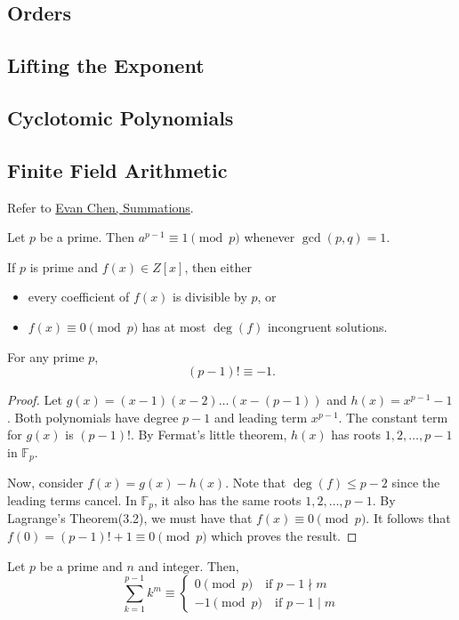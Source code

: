 \documentclass[11pt]{article}
\newcommand{\F}{\mathbb{F}}
\renewcommand{\>}{\rangle}
\newcommand{\<}{\langle}
\begin{document}
\subsection{Orders}
\subsection{Lifting the Exponent}
\subsection{Cyclotomic Polynomials}
\subsection{Finite Field Arithmetic}
Refer to \href{https://web.evanchen.cc/handouts/Summation/Summation.pdf}{Evan Chen, Summations}.
\begin{theorem} Let $p$ be a prime.  Then $a^{p-1} \equiv 1 \pmod{p}$ whenever $\gcd(p, q) = 1$.
\end{theorem}
\begin{theorem} If $p$ is prime and $f(x) \in Z[x]$, then either
\begin{itemize}
\item every coefficient of $f(x)$ is divisible by $p$, or 
\item $f(x) \equiv 0 \pmod{p}$ has at most $\deg(f)$ incongruent solutions.  
\end{itemize}
\end{theorem}
\begin{theorem} For any prime $p$,
$$(p-1)! \equiv -1.$$
\end{theorem}
\begin{proof}
Let $g(x) = (x-1)(x-2) \dots (x - (p-1))$ and $h(x) = x^{p-1} - 1$.  Both polynomials have degree $p-1$ and leading term $x^{p-1}$.  The constant term for $g(x)$ is $(p-1)!$.  By Fermat's little theorem, $h(x)$ has roots $1, 2, \dots, p-1$ in $\F_p$.

Now, consider $f(x) = g(x) - h(x)$.  Note that $\deg(f) \le p-2$ since the leading terms cancel.  In $\F_p$, it also has the same roots $1, 2, \dots, p-1$.   By Lagrange's Theorem(3.2), we must have that $f(x) \equiv 0 \pmod{p}$.  It follows that $f(0) = (p-1)! + 1 \equiv 0 \pmod{p}$ which proves the result.  
\end{proof}
\begin{theorem} Let $p$ be a prime and $n$ and integer.  Then,
$$\sum_{k=1}^{p-1} k^m \equiv \begin{cases}
0 \pmod{p} \quad \text{if } p-1 \nmid m \\
-1 \pmod{p} \quad \text{if } p-1 \mid m
\end{cases}$$
\end{theorem}
\end{document}
